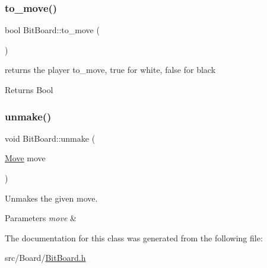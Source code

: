 \subsubsection{\texorpdfstring{to\+\_\+move()}{to\_move()}}
{\footnotesize\ttfamily bool Bit\+Board\+::to\+\_\+move (\begin{DoxyParamCaption}{ }\end{DoxyParamCaption})\hspace{0.3cm}{\ttfamily [inline]}}



returns the player to\+\_\+move, true for white, false for black 

\begin{DoxyReturn}{Returns}
Bool 
\end{DoxyReturn}
\mbox{\label{classBitBoard_ab81352f4aa143825a4763eba1947088c}} 
\subsubsection{\texorpdfstring{unmake()}{unmake()}}
{\footnotesize\ttfamily void Bit\+Board\+::unmake (\begin{DoxyParamCaption}\item[{\hyperlink{structMove}{Move}}]{move }\end{DoxyParamCaption})\hspace{0.3cm}{\ttfamily [inline]}}



Unmakes the given move. 


\begin{DoxyParams}{Parameters}
{\em move} & \\
\hline
\end{DoxyParams}


The documentation for this class was generated from the following file\+:\begin{DoxyCompactItemize}
\item 
src/\+Board/\hyperlink{BitBoard_8h}{Bit\+Board.\+h}\end{DoxyCompactItemize}
